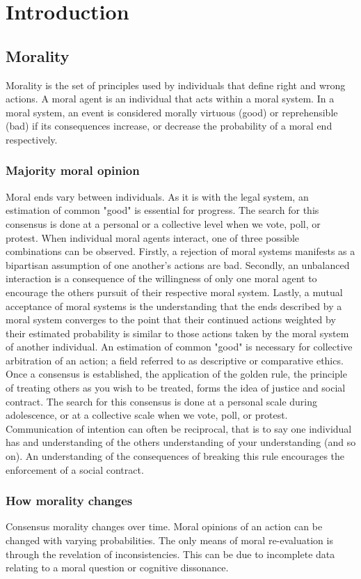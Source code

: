 \chapter{Introduction}
\section{Morality}
Morality is the set of principles used by individuals that define right and wrong actions.
A moral agent is an individual that acts within a moral system.
In a moral system, an event is considered morally virtuous (good) or reprehensible (bad) if its consequences increase, or decrease the probability of a moral end respectively.

\subsection{Majority moral opinion}
Moral ends vary between individuals.
As it is with the legal system, an estimation of common "good" is essential for progress.
The search for this consensus is done at a personal or a collective level when we vote, poll, or protest. 
When individual moral agents interact, one of three possible combinations can be observed.
Firstly, a rejection of moral systems manifests as a bipartisan assumption of one another's actions are bad. 
Secondly, an unbalanced interaction is a consequence of the willingness of only one moral agent to encourage the others pursuit of their respective moral system.
Lastly, a mutual acceptance of moral systems is the understanding that the ends described by a moral system converges to the point that their continued actions weighted by their estimated probability is similar to those actions taken by the moral system of another individual.
An estimation of common "good" is necessary for collective arbitration of an action; a field referred to as descriptive or comparative ethics.
Once a consensus is established, the application of the golden rule, the principle of treating others as you wish to be treated, forms the idea of justice and social contract.
The search for this consensus is done at a personal scale during adolescence, or at a collective scale when we vote, poll, or protest.
Communication of intention can often be reciprocal, that is to say one individual has and understanding of the others understanding of your understanding (and so on).
An understanding of the consequences of breaking this rule encourages the enforcement of a social contract.

\subsection{How morality changes}
Consensus morality changes over time.
Moral opinions of an action can be changed with varying probabilities.
The only means of moral re-evaluation is through the revelation of inconsistencies.
This can be due to incomplete data relating to a moral question or cognitive dissonance.

